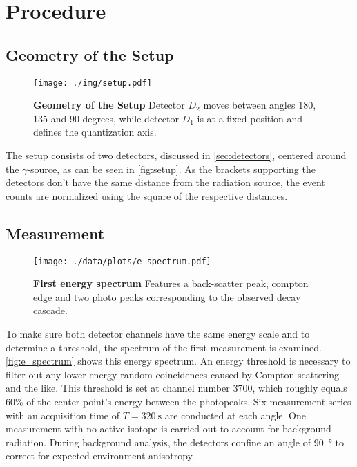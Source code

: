 \chapter{Procedure}

\section{Geometry of the Setup}
\begin{figure}[tbp]
	\centering
	\texttt{[image: ./img/setup.pdf]}
	\caption[Geometry of the Setup]{\textbf{Geometry of the Setup} Detector $D_2$ moves between angles 180, 135 and 90 degrees, while detector $D_1$ is at a fixed position and defines the quantization axis.}
	\label{fig:setup}
\end{figure}
The setup consists of two detectors, discussed in \autoref{sec:detectors}, centered around the $\gamma$-source, as can be seen in \autoref{fig:setup}.
As the brackets supporting the detectors don't have the same distance from the radiation source, the event counts are normalized using the square of the respective distances.

\section{Measurement}
\begin{figure}[tbp]
	\centering
	\texttt{[image: ./data/plots/e-spectrum.pdf]}
	\caption[First energy spectrum]{\textbf{First energy spectrum} Features a back-scatter peak, compton edge and two photo peaks corresponding to the observed decay cascade.}
	\label{fig:e_spectrum}
\end{figure}
To make sure both detector channels have the same energy scale and to determine a threshold, the spectrum of the first measurement is examined.
\autoref{fig:e_spectrum} shows this energy spectrum.
An energy threshold is necessary to filter out any lower energy random coincidences caused by Compton scattering and the like.
This threshold is set at channel number 3700, which roughly equals 60\% of the center point's energy between the photopeaks.
Six measurement series with an acquisition time of $T=\SI{320}{\second}$ are conducted at each angle.
One measurement with no active isotope is carried out to account for background radiation.
During background analysis, the detectors confine an angle of \SI{90}{\degree} to correct for expected environment anisotropy.
